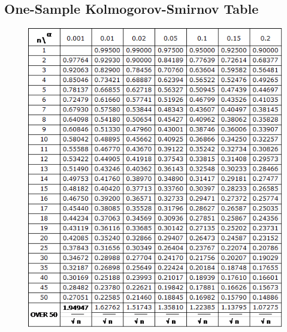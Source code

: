 \documentclass[11pt]{article}
\begin{document}
\begin{appendices}
\section{One-Sample Kolmogorov-Smirnov Table}\label{kstable}
\begin{figure}[H]
\begin{center}
    \includegraphics[width=1.0\textwidth]{./image/ks-table.png}
\end{center}
\end{figure}
\end{appendices}
\end{document}
